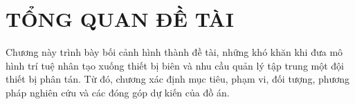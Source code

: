 \cleardoublepage
{}
\chapter{TỔNG QUAN ĐỀ TÀI}

Chương này trình bày bối cảnh hình thành đề tài, những khó khăn khi đưa mô
hình trí tuệ nhân tạo xuống thiết bị biên và nhu cầu quản lý tập trung một đội
thiết bị phân tán. Từ đó, chương xác định mục tiêu, phạm vi, đối tượng, phương
pháp nghiên cứu và các đóng góp dự kiến của đồ án.









